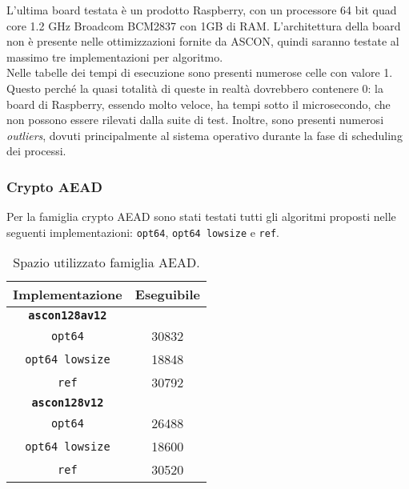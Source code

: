 L'ultima board testata è un prodotto Raspberry, con un processore 64 bit quad core 1.2 GHz Broadcom BCM2837 con 1GB di RAM\cite{raspberry}. L'architettura della board non è presente nelle ottimizzazioni fornite da ASCON, quindi saranno testate al massimo tre implementazioni per algoritmo. \\

\noindent Nelle tabelle dei tempi di esecuzione sono presenti numerose celle con valore 1. Questo perché la quasi totalità di queste in realtà dovrebbero contenere 0: la board di Raspberry, essendo molto veloce, ha tempi sotto il microsecondo, che non possono essere rilevati dalla suite di test. Inoltre, sono presenti numerosi \textit{outliers}, dovuti principalmente al sistema operativo durante la fase di scheduling dei processi.

\subsubsection{Crypto AEAD}

Per la famiglia crypto AEAD sono stati testati tutti gli algoritmi proposti nelle seguenti implementazioni: \texttt{opt64}, \texttt{opt64 lowsize} e \texttt{ref}.

\begin{table}[h]
    \caption{Spazio utilizzato famiglia AEAD.}
    \centering
    \begin{tabular}{|c|c|}
        \hline
        \textbf{Implementazione} & \textbf{Eseguibile} \\
        \hline
        \texttt{\textbf{ascon128av12}} & \\
        \hline
        \texttt{opt64} & 30832 \\
        \hline
        \texttt{opt64 lowsize} & 18848 \\
        \hline
        \texttt{ref} & 30792 \\
        \hline
        \texttt{\textbf{ascon128v12}} & \\
        \hline
        \texttt{opt64} & 26488 \\
        \hline
        \texttt{opt64 lowsize} & 18600 \\
        \hline
        \texttt{ref} & 30520 \\
        \hline
    \end{tabular}
\end{table}

